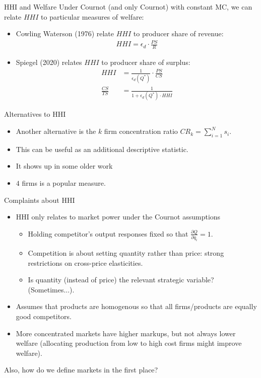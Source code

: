\documentclass[aspectratio=169,11pt]{beamer}
\begin{document}
\begin{frame}{HHI and Welfare}
Under Cournot (and only Cournot) with constant MC, we can relate $HHI$ to particular measures of welfare:
\begin{itemize}
\item Cowling Waterson (1976) relate $HHI$ to producer share of revenue:
\begin{align*}
HHI =  \epsilon_d \cdot \frac{PS}{R}
\end{align*}
\item Spiegel (2020) relates $HHI$ to producer share of surplus:
\begin{align*}
HHI &=  \frac{1}{\epsilon_d \left(Q^{*}\right)} \cdot \frac{PS}{CS}\\
\frac{C S}{TS} &=\frac{1}{1+\epsilon_d \left(Q^{*}\right) \cdot HHI}
\end{align*}
\end{itemize}
\end{frame}

\begin{frame}{Alternatives to HHI}
\begin{itemize}
\item Another alternative is the $k$ firm concentration ratio $CR_k = \sum_{i=1}^N s_i$.
\item This can be useful as an additional descriptive statistic.
\item It shows up in some older work
\item $4$ firms is a popular measure.
\end{itemize}
\end{frame}


\begin{frame}{Complaints about HHI}
\begin{itemize}
\item HHI only relates to market power under the Cournot assumptions
\begin{itemize}
\item Holding competitor's output responses fixed so that $\frac{\partial Q}{\partial q_i} =1$.
\item Competition is about setting quantity rather than price: strong restrictions on cross-price elasticities.
\item Is quantity (instead of price) the relevant strategic variable? (Sometimes...).
\end{itemize}
\item Assumes that products are \alert{homogenous} so that all firms/products are equally good competitors.
\item More concentrated markets have higher markups, but not always lower welfare (allocating production from low to high cost firms might improve welfare).
\end{itemize}
Also, how do we \alert{define markets} in the first place?
\end{frame}
\end{document}

